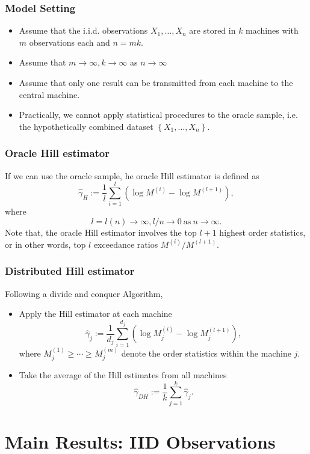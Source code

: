 \documentclass{beamer}
\newcommand{\suit}[1]{\left(#1\right)}
\newcommand{\set}[1]{\left\{#1\right\}}
\begin{document}
\begin{frame}
    \frametitle{Model Setting}
\begin{itemize}
    \item Assume that the i.i.d. observations $X_1, \dots, X_n$ are stored in $k$ machines with $m$ observations each and $n=mk$.
    \medskip
    \item Assume that $m \to \infty, k \to \infty$ as $n \to \infty$
    \medskip
    \item Assume that only one result can be transmitted from each machine  to the central machine.
    \medskip
    \item Practically, we cannot apply statistical procedures to the oracle sample,
    i.e. the hypothetically combined dataset $\set{X_1,\dots,X_n}$.
\end{itemize}

\end{frame}


\begin{frame}
    \frametitle{Oracle Hill estimator}
If we can use the oracle sample, he oracle Hill estimator is defined as 
$$
\hat{\gamma}_H:=\frac{1}{l}\sum_{i=1}^l (\log M^{(i)}-\log M^{(l+1)}),
$$
where 
$$
l=l(n) \to \infty, l/n \to 0 \ \text{as} \ n \to \infty.
$$
Note that, the oracle Hill estimator involves the top $l+1$ highest order statistics, or in other words, top $l$ exceedance ratios $M^{(i)}/M^{(l+1)}$.

\end{frame}


\begin{frame}
    \frametitle{Distributed Hill estimator}
Following a divide and conquer Algorithm,
\begin{itemize}
    \item Apply the Hill estimator at each machine
            $$
                \hat{\gamma}_j:=\frac{1}{d_j}\sum_{i=1}^{d_j}\suit{\log M_j^{(i)}-\log M_j^{(l+1)}},
            $$
            where $M_j^{(1)}\ge \cdots \ge M_j^{(m)}$ denote the order statistics within the machine $j$.
    \item Take the average of the Hill estimates from all machines
        $$
            \hat{\gamma}_{DH}:=\frac{1}{k}\sum_{j=1}^k \hat{\gamma}_j.
        $$
\end{itemize}
    

\end{frame}
\section{Main Results: IID Observations}
\end{document}
